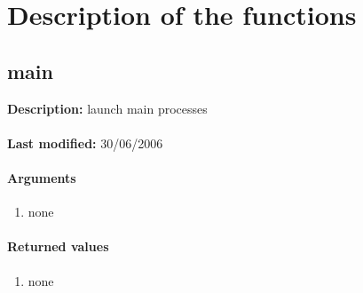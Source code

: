 

\section{Description of the functions}
\label{function_description}

\subsection{main }
\textbf{Description:} launch main processes\\
\\\textbf{Last modified:} 30/06/2006

\paragraph{Arguments}
\begin{enumerate}
\item none
\end{enumerate}

\paragraph{Returned values}
\begin{enumerate}
\item none
\end{enumerate}

